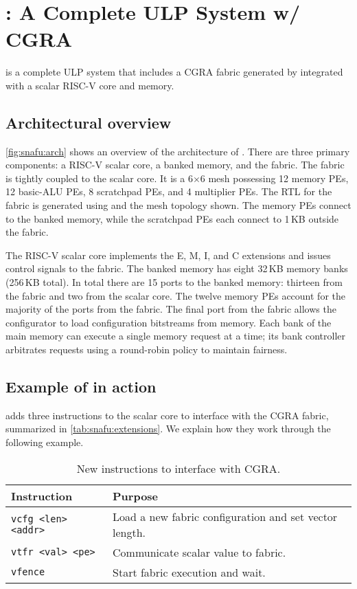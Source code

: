 \section{\snafuarch: A Complete ULP System w/ CGRA}
\label{snafu:arch}
 
\snafuarch is a complete ULP system that includes a CGRA fabric generated by \snafuframe
integrated with a scalar RISC-V core and memory.

\subsection{Architectural overview}
\autoref{fig:snafu:arch} shows an overview of the architecture of \snafuarch.
% 
There are three primary components: a \mbox{RISC-V} scalar core, a banked memory, and the \snafuframe fabric.
% 
The \snafu fabric is tightly coupled to the scalar core.
% 
It is a 6$\times$6 mesh possessing 12 memory PEs, 12 basic-ALU PEs, 8 scratchpad PEs, and 4 multiplier PEs.
% 
The RTL for the fabric is generated using \snafuframe and the mesh topology shown.
%
The memory PEs connect to the banked memory, while the scratchpad PEs each connect to 1\,KB outside the fabric.

\figSNAFUArch

The RISC-V scalar core implements the E, M, I, and C extensions and issues control signals to the \snafuframe fabric.
% 
The banked memory has eight 32\,KB memory banks (256\,KB total). 
% 
In total there are 15 ports to the banked memory: thirteen from the \snafuframe fabric and two from the scalar core.
% 
The twelve memory PEs account for the majority of the ports from the fabric.
% 
The final port from the fabric allows the \snafuframe configurator to load configuration bitstreams from memory.
% 
Each bank of the main memory can execute a single memory request at a time; its bank controller arbitrates requests using a round-robin policy to maintain fairness.

\subsection{Example of \snafuarch in action}

\snafuarch adds three instructions to the scalar core to interface with the CGRA fabric,
summarized in \autoref{tab:snafu:extensions}.
We explain how they work through the following example.

\begin{table}[t]
  \centering
  \footnotesize
  \begin{tabular}{lp{1.85in}}
    \toprule
    \bf Instruction & \bf Purpose \\
    \midrule
    {\tt vcfg <len> <addr>} & Load a new fabric configuration and set vector length. \\
    {\tt vtfr <val> <pe>} & Communicate scalar value to fabric. \\
    {\tt vfence} & Start fabric execution and wait. \\
    \bottomrule
  \end{tabular}
  \caption{New instructions to interface with CGRA.}
  \label{tab:snafu:extensions}
\end{table}

